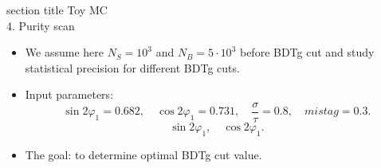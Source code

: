 \documentclass[10 pt,compress,mathserif]{beamer}
\begin{document}
\begin{frame}
 \centering
   \begin{beamercolorbox}[sep=8pt,center]{section title}
      Toy MC\\ 4. Purity scan
   \end{beamercolorbox}
    
    \begin{block}{}
    \begin{itemize}
     \item We assume here $N_S=10^3$ and $N_{B}=5\cdot10^3$ before BDTg cut and study statistical precision for different BDTg cuts.
     \item Input parameters:
     \begin{equation*}
      \sin2\varphi_1=0.682,\quad \cos2\varphi_1=0.731,\quad \frac{\sigma}{\tau}=0.8,\quad mistag = 0.3.
     \end{equation*}
     \begin{equation*}
      \sin2\varphi_1,\quad \cos2\varphi_1.
     \end{equation*}
    \item The goal: to determine optimal BDTg cut value.
    \end{itemize}
    \end{block}
\end{frame}
\end{document}
